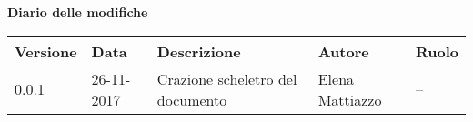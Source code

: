 \documentclass[main.tex]{subfiles}
\begin{document}
	
	\huge \bfseries Diario delle modifiche\\
	\begin{table}[htbp]
		\centering
		\renewcommand\arraystretch{1.2}
		
		\begin{tabularx}{\textwidth}{p{2cm}|p{2cm}|p{3cm}|p{2cm}|p{3cm}}
			\hline
			\textbf{Versione} & \textbf{Data} & \textbf{Descrizione} & \textbf{Autore} & \textbf{Ruolo}\\
			\hline
			0.0.1 & 26-11-2017 & Crazione scheletro del documento & Elena Mattiazzo & -- \\
			\hline
			
		\end{tabularx}
		
	\end{table}
\end{document}
